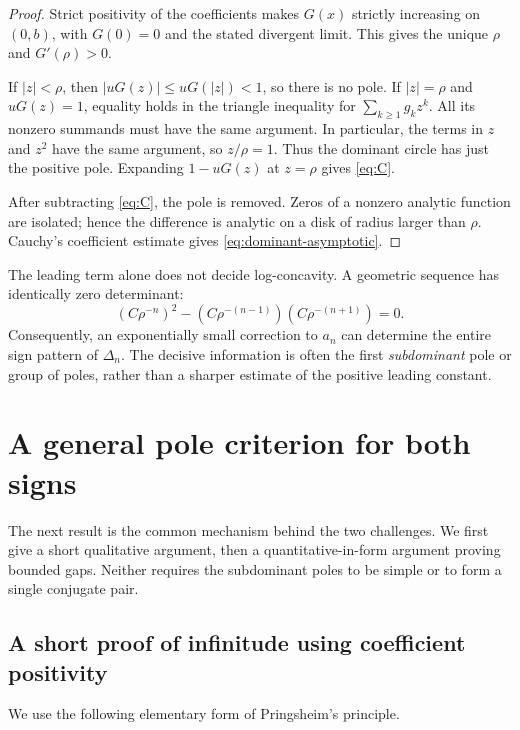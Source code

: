 \documentclass[11pt,letterpaper]{article}
\theoremstyle{definition}
\newcommand{\Delt}{\Delta}
\numberwithin{equation}{section}
\begin{document}
\begin{proof}
Strict positivity of the coefficients makes $G(x)$ strictly increasing
on $(0,b)$, with $G(0)=0$ and the stated divergent limit. This gives the
unique $\rho$ and $G'(\rho)>0$.

If $|z|<\rho$, then $|uG(z)|\le uG(|z|)<1$, so there is no pole.
If $|z|=\rho$ and $uG(z)=1$, equality holds in the triangle inequality
for $\sum_{k\ge1}g_kz^k$. All its nonzero summands must have the same
argument. In particular, the terms in $z$ and $z^2$ have the same argument,
so $z/\rho=1$. Thus the dominant circle has just the positive pole.
Expanding $1-uG(z)$ at $z=\rho$ gives \eqref{eq:C}.

After subtracting \eqref{eq:C}, the pole is removed. Zeros of a nonzero
analytic function are isolated; hence the difference is analytic on a
disk of radius larger than $\rho$. Cauchy's coefficient estimate gives
\eqref{eq:dominant-asymptotic}.
\end{proof}

The leading term alone does not decide log-concavity. A geometric
sequence has identically zero determinant:
\begin{equation}\label{eq:leading-cancellation}
(C\rho^{-n})^2-(C\rho^{-(n-1)})(C\rho^{-(n+1)})=0.
\end{equation}
Consequently, an exponentially small correction to $a_n$ can determine
the entire sign pattern of $\Delt_n$. The decisive information is often
the first \emph{subdominant} pole or group of poles, rather than a sharper
estimate of the positive leading constant.

\section{A general pole criterion for both signs}
\label{sec:criterion}

The next result is the common mechanism behind the two challenges.
We first give a short qualitative argument, then a quantitative-in-form
argument proving bounded gaps. Neither requires the subdominant poles
to be simple or to form a single conjugate pair.

\subsection{A short proof of infinitude using coefficient positivity}

We use the following elementary form of Pringsheim's principle.
\end{document}
